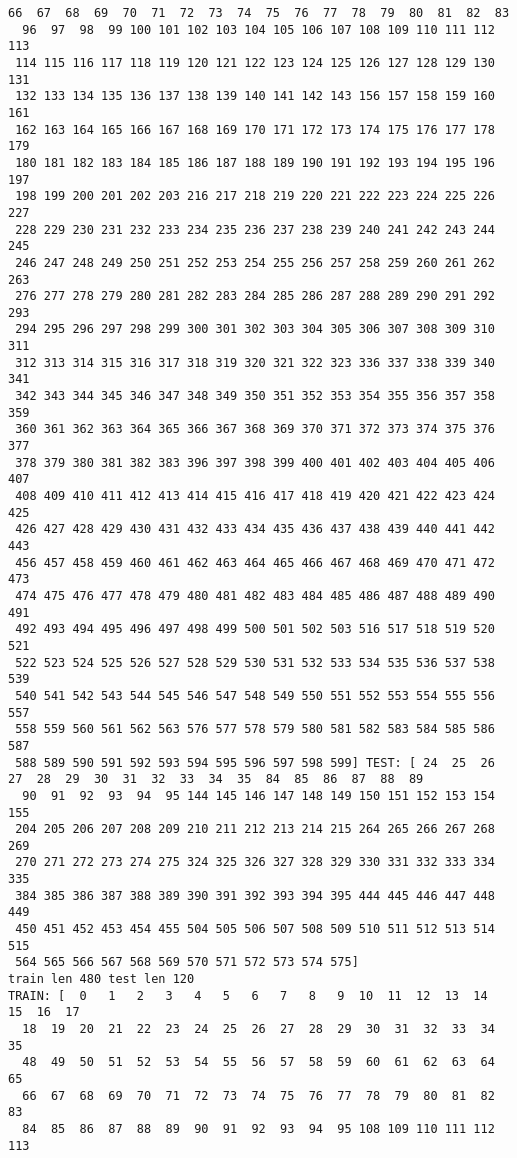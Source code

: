 \documentclass[11pt]{article}
\begin{document}
\begin{Verbatim}[commandchars=\\\{\}]
  66  67  68  69  70  71  72  73  74  75  76  77  78  79  80  81  82  83
  96  97  98  99 100 101 102 103 104 105 106 107 108 109 110 111 112 113
 114 115 116 117 118 119 120 121 122 123 124 125 126 127 128 129 130 131
 132 133 134 135 136 137 138 139 140 141 142 143 156 157 158 159 160 161
 162 163 164 165 166 167 168 169 170 171 172 173 174 175 176 177 178 179
 180 181 182 183 184 185 186 187 188 189 190 191 192 193 194 195 196 197
 198 199 200 201 202 203 216 217 218 219 220 221 222 223 224 225 226 227
 228 229 230 231 232 233 234 235 236 237 238 239 240 241 242 243 244 245
 246 247 248 249 250 251 252 253 254 255 256 257 258 259 260 261 262 263
 276 277 278 279 280 281 282 283 284 285 286 287 288 289 290 291 292 293
 294 295 296 297 298 299 300 301 302 303 304 305 306 307 308 309 310 311
 312 313 314 315 316 317 318 319 320 321 322 323 336 337 338 339 340 341
 342 343 344 345 346 347 348 349 350 351 352 353 354 355 356 357 358 359
 360 361 362 363 364 365 366 367 368 369 370 371 372 373 374 375 376 377
 378 379 380 381 382 383 396 397 398 399 400 401 402 403 404 405 406 407
 408 409 410 411 412 413 414 415 416 417 418 419 420 421 422 423 424 425
 426 427 428 429 430 431 432 433 434 435 436 437 438 439 440 441 442 443
 456 457 458 459 460 461 462 463 464 465 466 467 468 469 470 471 472 473
 474 475 476 477 478 479 480 481 482 483 484 485 486 487 488 489 490 491
 492 493 494 495 496 497 498 499 500 501 502 503 516 517 518 519 520 521
 522 523 524 525 526 527 528 529 530 531 532 533 534 535 536 537 538 539
 540 541 542 543 544 545 546 547 548 549 550 551 552 553 554 555 556 557
 558 559 560 561 562 563 576 577 578 579 580 581 582 583 584 585 586 587
 588 589 590 591 592 593 594 595 596 597 598 599] TEST: [ 24  25  26  27  28  29  30  31  32  33  34  35  84  85  86  87  88  89
  90  91  92  93  94  95 144 145 146 147 148 149 150 151 152 153 154 155
 204 205 206 207 208 209 210 211 212 213 214 215 264 265 266 267 268 269
 270 271 272 273 274 275 324 325 326 327 328 329 330 331 332 333 334 335
 384 385 386 387 388 389 390 391 392 393 394 395 444 445 446 447 448 449
 450 451 452 453 454 455 504 505 506 507 508 509 510 511 512 513 514 515
 564 565 566 567 568 569 570 571 572 573 574 575]
train len 480 test len 120
TRAIN: [  0   1   2   3   4   5   6   7   8   9  10  11  12  13  14  15  16  17
  18  19  20  21  22  23  24  25  26  27  28  29  30  31  32  33  34  35
  48  49  50  51  52  53  54  55  56  57  58  59  60  61  62  63  64  65
  66  67  68  69  70  71  72  73  74  75  76  77  78  79  80  81  82  83
  84  85  86  87  88  89  90  91  92  93  94  95 108 109 110 111 112 113

\end{Verbatim}
\end{document}
